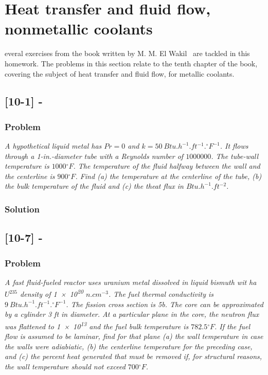 %
%
\let\textcircled=\pgftextcircled
\chapter{Heat transfer and fluid flow, nonmetallic coolants}
\label{chap:intro}

everal exercises from the book written by M. M. El Wakil~\cite{book01} are tackled in this homework. The problems in this section relate to the tenth chapter of the book, covering the subject of heat transfer and fluid flow, for metallic coolants.

\section{[10-1] - }
\label{prob101}


\subsection{Problem}
\textit{A hypothetical liquid metal has $Pr = 0$ and $k = 50\ Btu.h^{-1}.ft^{-1}.{}^\circ F^{-1}$. It flows through a 1-in.-diameter tube with a Reynolds number of $1000000$. The tube-wall temperature is $1000{}^\circ F$. The temperature of the fluid halfway between the wall and the centerline is $900{}^\circ F$. Find (a) the temperature at the centerline of the tube, (b) the bulk temperature of the fluid and (c) the theat flux in $Btu.h^{-1}.ft^{-2}$.}

\subsection{Solution}





\section{[10-7] - }
\label{prob102}


\subsection{Problem}
\textit{A fast fluid-fueled reactor uses uranium metal dissolved in liquid bismuth wit ha $U^{235}$ density of \num{1e20} $n.cm^{-3}$. The fuel thermal conductivity is $9\ Btu.h^{-1}.ft^{-1}.{}^\circ F^{-1}$. The fission cross section is 5b. The core can be approximated by a cylinder 3 ft in diameter. At a particular plane in the core, the neutron flux was flattened to \num{1e13} and the fuel bulk temperature is $782.5{}^\circ F$. If the fuel flow is assumed to be laminar, find for that plane (a) the wall temperature in case the walls were adiabiatic, (b) the centerline temperature for the preceding case, and (c) the percent heat generated that must be removed if, for structural reasons, the wall temperature should not exceed $700{}^\circ F$.}


